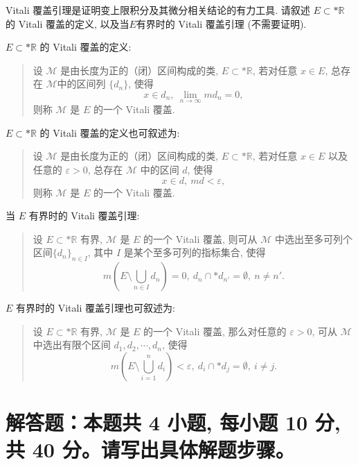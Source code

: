 \begin{question}[points = 10]
  Vitali 覆盖引理是证明变上限积分及其微分相关结论的有力工具. 请叙述 $E\subset* \mathbb{R}$ 的 Vitali 覆盖的定义, 以及当$E$有界时的 Vitali 覆盖引理 (不需要证明).
\end{question}

\begin{solution}
  \(E\subset* \mathbb{R}\) 的 Vitali 覆盖的定义: 

  \begin{quote}
  设 \(\mathscr{M}\) 是由长度为正的（闭）区间构成的类, \(E \subset* \mathbb{R}\), 若对任意 \(x \in E\), 总存在 \(\mathscr{M}\)中的区间列 \(\{d_n\}\), 使得
  \[x \in d_n, ~ \lim\limits_{n\to\infty} m d_n = 0,\]
  则称 \(\mathscr{M}\) 是 \(E\) 的一个 Vitali 覆盖.
  \end{quote}

  \(E\subset* \mathbb{R}\) 的 Vitali 覆盖的定义也可叙述为:

  \begin{quote}
  设 \(\mathscr{M}\) 是由长度为正的（闭）区间构成的类, \(E \subset* \mathbb{R}\), 若对任意 \(x \in E\) 以及任意的 \(\varepsilon > 0\), 总存在 \(\mathscr{M}\) 中的区间 \(d\), 使得
  \[x \in d, ~ m d < \varepsilon,\]
  则称 \(\mathscr{M}\) 是 \(E\) 的一个 Vitali 覆盖.
  \end{quote}

  当 \(E\) 有界时的 Vitali 覆盖引理: 

  \begin{quote}
  设 \(E \subset* \mathbb{R}\) 有界, \(\mathscr{M}\) 是 \(E\) 的一个 Vitali 覆盖, 则可从 \(\mathscr{M}\) 中选出至多可列个区间\(\{d_n\}_{n \in I}\), 其中 \(I\) 是某个至多可列的指标集合, 使得
  \[m \left( E \setminus \bigcup\limits_{n \in I} d_n \right) = 0, ~ d_n \cap* d_{n'} = \emptyset, ~ n \neq n'.\]
  \end{quote}

  \(E\) 有界时的 Vitali 覆盖引理也可叙述为:

  \begin{quote}
  设 \(E \subset* \mathbb{R}\) 有界, \(\mathscr{M}\) 是 \(E\) 的一个 Vitali 覆盖, 那么对任意的 \(\varepsilon > 0\), 可从 \(\mathscr{M}\) 中选出有限个区间 \(d_1, d_2, \cdots, d_n\), 使得
  \[m \left( E \setminus \bigcup\limits_{i=1}^n d_i \right) < \varepsilon, ~ d_i \cap* d_j = \emptyset, ~ i \neq j.\]
  \end{quote}
\end{solution}


\section{解答题：本题共 4 小题, 每小题 10 分, 共 40 分。请写出具体解题步骤。}

